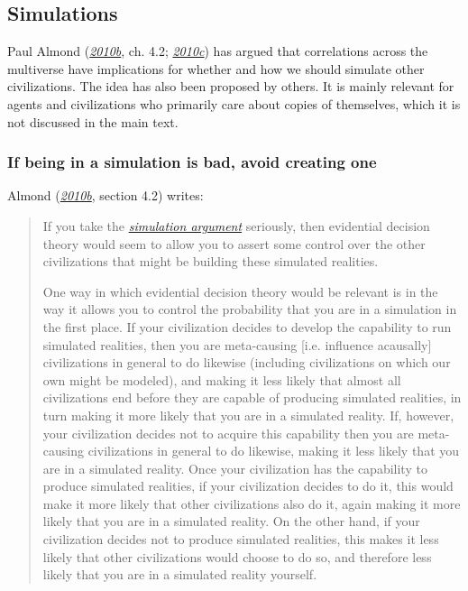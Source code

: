 \hypertarget{simulations}{\subsection{Simulations}\label{simulations}}

Paul Almond
(\href{https://web.archive.org/web/20120310010225/http://www.paul-almond.com/Correlation2.pdf}{\emph{2010b}},
ch. 4.2;
\href{https://www.researchgate.net/publication/265224117_Can_you_retroactively_put_yourself_in_a_computer_simulation}{\emph{2010c}})
has argued that correlations across the multiverse have implications for
whether and how we should simulate other civilizations. The idea has
also been proposed by others. It is mainly relevant for agents and
civilizations who primarily care about copies of themselves, which it is
not discussed in the main text.

\subsubsection{If being in a simulation is bad, avoid creating
one}\label{if-being-in-a-simulation-is-bad-avoid-creating-one}

Almond
(\href{https://web.archive.org/web/20120310010225/http://www.paul-almond.com/Correlation2.pdf}{\emph{2010b}},
section 4.2) writes:

\begin{quote}
If you take the
\href{http://www.simulation-argument.com/}{\emph{simulation argument}}
seriously, then evidential decision theory would seem to allow you to
assert some control over the other civilizations that might be building
these simulated realities.

One way in which evidential decision theory would be relevant is in the
way it allows you to control the probability that you are in a
simulation in the first place. If your civilization decides to develop
the capability to run simulated realities, then you are meta-causing
{[}i.e. influence acausally{]} civilizations in general to do likewise
(including civilizations on which our own might be modeled), and making
it less likely that almost all civilizations end before they are capable
of producing simulated realities, in turn making it more likely that you
are in a simulated reality. If, however, your civilization decides not
to acquire this capability then you are meta-causing civilizations in
general to do likewise, making it less likely that you are in a
simulated reality. Once your civilization has the capability to produce
simulated realities, if your civilization decides to do it, this would
make it more likely that other civilizations also do it, again making it
more likely that you are in a simulated reality. On the other hand, if
your civilization decides not to produce simulated realities, this makes
it less likely that other civilizations would choose to do so, and
therefore less likely that you are in a simulated reality yourself.
\end{quote}

